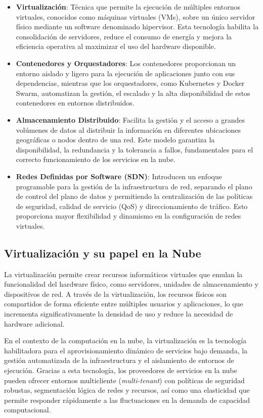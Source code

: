 {            \begin{itemize}
                \item \textbf{Virtualización}: Técnica que permite la ejecución de múltiples entornos virtuales, conocidos como máquinas virtuales (VMs), sobre un único servidor físico mediante un software denominado hipervisor. Esta tecnología habilita la consolidación de servidores, reduce el consumo de energía y mejora la eficiencia operativa al maximizar el uso del hardware disponible.
                \item \textbf{Contenedores y Orquestadores}: Los contenedores proporcionan un entorno aislado y ligero para la ejecución de aplicaciones junto con sus dependencias, mientras que los orquestadores, como Kubernetes y Docker Swarm, automatizan la gestión, el escalado y la alta disponibilidad de estos contenedores en entornos distribuidos.
                \item \textbf{Almacenamiento Distribuido}: Facilita la gestión y el acceso a grandes volúmenes de datos al distribuir la información en diferentes ubicaciones geográficas o nodos dentro de una red. Este modelo garantiza la disponibilidad, la redundancia y la tolerancia a fallos, fundamentales para el correcto funcionamiento de los servicios en la nube.
                \item \textbf{Redes Definidas por Software (SDN)}: Introducen un enfoque programable para la gestión de la infraestructura de red, separando el plano de control del plano de datos y permitiendo la centralización de las políticas de seguridad, calidad de servicio (QoS) y direccionamiento de tráfico. Esto proporciona mayor flexibilidad y dinamismo en la configuración de redes virtuales.
            \end{itemize}
            
        \subsection{Virtualización y su papel en la Nube}
            La virtualización permite crear recursos informáticos virtuales que emulan la funcionalidad del hardware físico, como servidores, unidades de almacenamiento y dispositivos de red. A través de la virtualización, los recursos físicos son compartidos de forma eficiente entre múltiples usuarios y aplicaciones, lo que incrementa significativamente la densidad de uso y reduce la necesidad de hardware adicional.
            
            En el contexto de la computación en la nube, la virtualización es la tecnología habilitadora para el aprovisionamiento dinámico de servicios bajo demanda, la gestión automatizada de la infraestructura y el aislamiento de entornos de ejecución. Gracias a esta tecnología, los proveedores de servicios en la nube pueden ofrecer entornos multicliente (\textit{multi-tenant}) con políticas de seguridad robustas, segmentación lógica de redes y recursos, así como una elasticidad que permite responder rápidamente a las fluctuaciones en la demanda de capacidad computacional.
            
}
